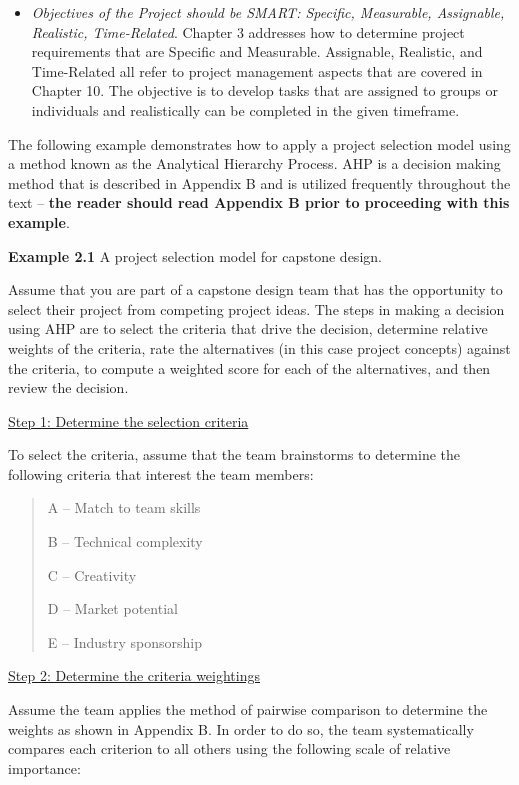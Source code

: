 \begin{itemize}
\item
  \emph{Objectives of the Project should be SMART: Specific, Measurable,
  Assignable, Realistic, Time-Related}. Chapter 3 addresses how to
  determine project requirements that are Specific and Measurable.
  Assignable, Realistic, and Time-Related all refer to project
  management aspects that are covered in Chapter 10. The objective is to
  develop tasks that are assigned to groups or individuals and
  realistically can be completed in the given timeframe.
\end{itemize}

The following example demonstrates how to apply a project selection
model using a method known as the Analytical Hierarchy Process. AHP is a
decision making method that is described in Appendix B and is utilized
frequently throughout the text -- \textbf{the reader should read
Appendix B prior to proceeding with this example}.

\textbf{Example 2.1} A project selection model for capstone design.

Assume that you are part of a capstone design team that has the
opportunity to select their project from competing project ideas. The
steps in making a decision using AHP are to select the criteria that
drive the decision, determine relative weights of the criteria, rate the
alternatives (in this case project concepts) against the criteria, to
compute a weighted score for each of the alternatives, and then review
the decision.

\ul{Step 1: Determine the selection criteria}

To select the criteria, assume that the team brainstorms to determine
the following criteria that interest the team members:

\begin{quote}
A -- Match to team skills

B -- Technical complexity

C -- Creativity

D -- Market potential

E -- Industry sponsorship
\end{quote}

\ul{Step 2: Determine the criteria weightings}

Assume the team applies the method of pairwise comparison to determine
the weights as shown in Appendix B. In order to do so, the team
systematically compares each criterion to all others using the following
scale of relative importance:

